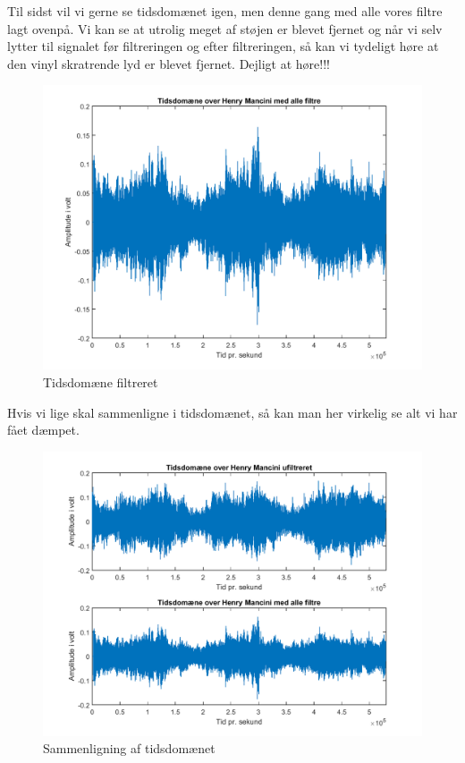 \documentclass[12pt, letterpaper]{article}
\begin{document}
\newpage
Til sidst vil vi gerne se tidsdomænet igen, men denne gang med alle vores filtre lagt ovenpå. Vi kan se at utrolig meget af støjen er blevet fjernet og når vi selv lytter til signalet før filtreringen og efter filtreringen, så kan vi tydeligt høre at den vinyl skratrende lyd er blevet fjernet. Dejligt at høre!!!  
\begin{figure}[H]
           \includegraphics[width=\linewidth]{billeder/Vinyltidfiltreret}	   							\caption{Tidsdomæne filtreret}
\end{figure} 

\newpage
Hvis vi lige skal sammenligne i tidsdomænet, så kan man her virkelig se alt vi har fået dæmpet. 
\begin{figure}[H]
           \includegraphics[width=\linewidth]{billeder/Vinylsamtid}	   							\caption{Sammenligning af tidsdomænet}
\end{figure} 
\end{document}
